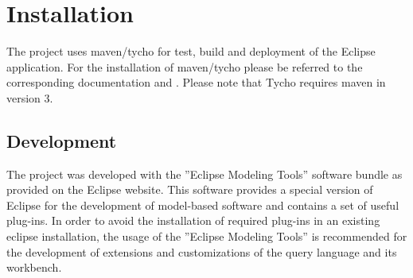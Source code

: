 \section{Installation}
The project uses maven/tycho for test, build and deployment of the Eclipse 
application. For the installation of maven/tycho please be referred to the 
corresponding documentation \cite{tycho} and \cite{maven}. Please note that 
Tycho requires maven in version 3.

\subsection{Development}
The project was developed with the ''Eclipse Modeling Tools'' software bundle as
provided on the Eclipse website. This software provides a special version of 
Eclipse for the development of model-based software and contains a set of useful
plug-ins. In order to avoid the installation of required plug-ins in an existing
eclipse installation, the usage of the ''Eclipse Modeling Tools'' is recommended
for the development of extensions and customizations of the query language and
its workbench.

